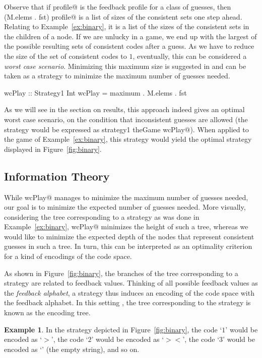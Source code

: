\documentclass[a4paper]{article}
\makeatletter
\theoremstyle{definition}
\newtheorem{example}{Example}
\newcommand{\cmd}[1]{\Verb@#1@}
\newcommand{\ignore}[1]{}  %
\newcommand{\strategy}[1]{\marginpar{\bigskip\cmd{#1}}}
\makeatother
\begin{document}
\ignore{$}
Observe that if \cmd{profile} is the feedback profile for a class of guesses, then \cmd{(M.elems . fst) profile} is a list of sizes of the consistent sets one step ahead.
Relating to Example~\ref{ex:binary}, it is a list of the sizes of the consistent sets in the children of a node.
If we are unlucky in a game, we end up with the largest of the possible resulting sets of consistent codes after a guess.
As we have to reduce the size of the set of consistent codes to $1$, eventually, this can be considered a \emph{worst case scenario}.
Minimizing this maximum size is suggested in \citep{Knuth1976:tcam} and can be taken as a strategy to minimize the maximum number of guesses needed.
\strategy{wcPlay}

\begin{code}
wcPlay :: Strategy1 Int
wcPlay = maximum . M.elems . fst
\end{code}

As we will see in the section on results, this approach indeed gives an optimal worst case scenario, on the condition that inconsistent guesses are allowed (the strategy would be expressed as \cmd{strategy1 theGame wcPlay}).
When applied to the game of Example~\ref{ex:binary}, this strategy would yield the optimal strategy displayed in Figure~\ref{fig:binary}.

\subsection*{Information Theory}
While \cmd{wcPlay} manages to minimize the maximum number of guesses needed, our goal is to minimize the expected number of guesses needed.
More visually, considering the tree corresponding to a strategy as was done in Example~\ref{ex:binary}, \cmd{wcPlay} minimizes the height of such a tree, whereas we would like to minimize the expected depth of the nodes that represent consistent guesses in such a tree.
In turn, this can be interpreted as an optimality criterion for a kind of encodings of the code space.

As shown in Figure~\ref{fig:binary}, the branches of the tree corresponding to a strategy are related to feedback values.
Thinking of all possible feedback values as the \emph{feedback alphabet}, a strategy thus induces an encoding of the code space with the feedback alphabet.
In this setting \citep{CoverThomas1991:eit}, the tree corresponding to the strategy is known as the encoding tree.

\begin{example}
\label{ex:encoding}
In the strategy depicted in Figure~\ref{fig:binary}, the code `$1$' would be encoded as `$>$', the code `$2$' would be encoded as `$><$', the code `$3$' would be encoded as `' (the empty string), and so on.
\end{example}
\end{document}
